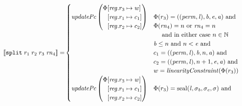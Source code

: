 \documentclass[a3paper]{article}
\newcommand{\sem}[1]{\left\llbracket #1 \right\rrbracket}
\newcommand{\tand}{\text{ and }}
\newcommand{\tor}{\text{ or }}
\newcommand{\targetcolor}[1]{\color{black}}
\newcommand{\trg}[1]{{\targetcolor{} #1}}
\newcommand{\zinstr}[1]{\texttt{#1}}
\newcommand{\fourinstr}[5]{
  \ifthenelse{\equal{#2#3#4#5}{}}
  {\zinstr{#1}}
  {\zinstr{#1} \; #2 \; #3 \; #4 \; #5}
}
\newcommand{\tsplit}[4]{\fourinstr{\trg{split}}{#1}{#2}{#3}{#4}}
\newcommand{\nats}{\mathbb{N}}
\newcommand{\update}[2]{[#1 \mapsto #2]}
\newcommand{\updReg}[2]{\update{\reg.#1}{#2}}
\newcommand{\shareddom}[1]{\mathrm{#1}}
\newcommand{\perm}{\var{perm}}
\newcommand{\lin}{\var{l}}
\newcommand{\seal}[1]{\shareddom{seal}(#1)}
\newcommand{\var}[1]{\mathit{#1}}
\newcommand{\rn}{\var{rn}}
\newcommand{\reg}{\var{reg}}
\newcommand{\baddr}{\var{b}}
\newcommand{\eaddr}{\var{e}}
\newcommand{\aaddr}{\var{a}}
\newcommand{\plainfun}[2]{
  \ifthenelse{\equal{#2}{}}
  {\mathit{#1}}
  {\mathit{#1}(#2)}
}
\newcommand{\linCons}[1]{\plainfun{linearityConstraint}{#1}}
\newcommand{\updPcAddr}[1]{\plainfun{updatePc}{#1}}
\begin{document}
\begin{align*}
  \sem{\tsplit{r_1}{r_2}{r_3}{\rn_4}} = &
                               \begin{cases}
                                 \updPcAddr{}\left(
                                   \arraycolsep=0pt
                                   \begin{array}{rl}
                                     \Phi&\updReg{r_3}{w}\\
                                         &\updReg{r_1}{c_1}\\
                                         &\updReg{r_2}{c_2}
                                   \end{array}\right)
&
                                 \arraycolsep=0pt
                                 \begin{array}[t]{l}
                                   \Phi(r_3) = ((\perm,\lin),\baddr,\eaddr,\aaddr) \tand \\
                                   \Phi(\rn_4) = n \tor \rn_4 = n \\
                                   \quad\text{ and in either case } n \in \nats \\
                                   \baddr \leq n \tand n < \eaddr \tand \\
                                   c_1 = ((\perm,\lin),\baddr,n,\aaddr) \tand \\
                                   c_2 = ((\perm,\lin),n+1,\eaddr,\aaddr) \tand \\
                                   w = \linCons{\Phi(r_3)}
                                 \end{array}\\
                                 \updPcAddr{} \left(
                                 \arraycolsep=0pt
                                 \begin{array}{rl}
                                   \Phi&\updReg{r_3}{w}\\
                                       &\updReg{r_1}{c_1}\\
                                       &\updReg{r_2}{c_2}
                                 \end{array} \right)
&
                                 \arraycolsep=0pt
                                 \begin{array}[t]{l}
                                   \Phi(r_3) = \seal{\lin,\sigma_\baddr,\sigma_\eaddr,\sigma} \tand \\

\end{array}
\end{cases}
\end{align*}
\end{document}
